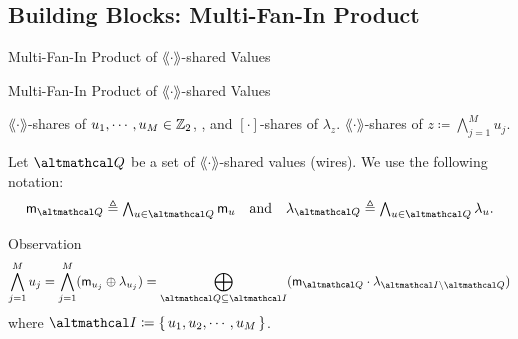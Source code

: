 \documentclass[../240906_cryptlab_flute.tex]{subfiles}
\begin{document}
\subsection{Building Blocks: Multi-Fan-In Product}
\begin{frame}{Multi-Fan-In Product of \(\lang\cdot\rang\)-shared Values}
    \begin{block}{Multi-Fan-In Product of \(\lang\cdot\rang\)-shared Values}
        \begin{description}[Output]
            \ii[Input]
            \(\lang\cdot\rang\)-shares of \(u_1, \cdots, u_M \in \mathbb{Z}_2\), ,
            and \([\cdot]\)-shares of \(\lambda_z\).
            \ii[Output]
            \(\lang\cdot\rang\)-shares of \(z \coloneqq \bigwedge_{j=1}^M u_j\).
        \end{description}
    \end{block}
    \pause
    \begin{exampleblock}{}
        Let \(\mcal{Q}\) be a set of
        \(\lang\cdot\rang\)-shared values (wires).
        We use the following notation:
        \[\textstyle
            \msf{m}_{\mcal{Q}} \triangleq \bigwedge_{u \in \mcal{Q}} \msf{m}_u
            \quad\text{and}\quad
            \lambda_{\mcal{Q}} \triangleq \bigwedge_{u \in \mcal{Q}} \lambda_u.
        \]
    \end{exampleblock}
    \pause
    \begin{exampleblock}{Observation}
        \[
            \bigwedge_{j=1}^M u_j = \bigwedge_{j=1}^M (\msf{m}_{u_j} \oplus \lambda_{u_j})
            = \bigoplus_{\mcal{Q} \subseteq \mcal{I}}
                (\msf{m}_{\mcal{Q}} \cdot \lambda_{\mcal{I} \setminus \mcal{Q}})
        \]
        where \(\mcal{I} \coloneqq \{\,u_1,u_2,\cdots,u_M\,\}\).
    \end{exampleblock}
\end{frame}
\end{document}
